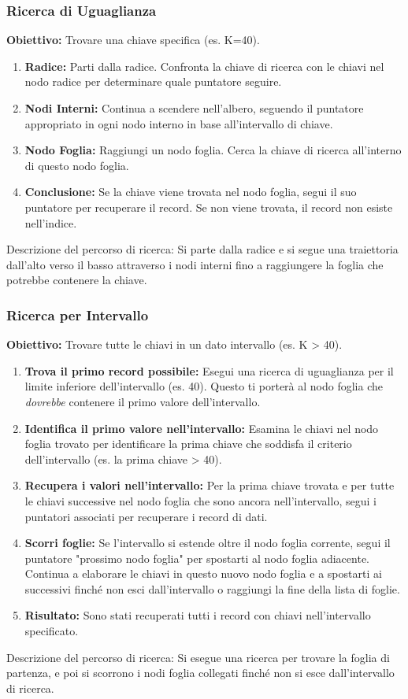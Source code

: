 \subsubsection{Ricerca di Uguaglianza}
\textbf{Obiettivo:} Trovare una chiave specifica (es. K=40).
\begin{enumerate}
    \item \textbf{Radice:} Parti dalla radice. Confronta la chiave di ricerca con le chiavi nel nodo radice per determinare quale puntatore seguire.
    \item \textbf{Nodi Interni:} Continua a scendere nell'albero, seguendo il puntatore appropriato in ogni nodo interno in base all'intervallo di chiave.
    \item \textbf{Nodo Foglia:} Raggiungi un nodo foglia. Cerca la chiave di ricerca all'interno di questo nodo foglia.
    \item \textbf{Conclusione:} Se la chiave viene trovata nel nodo foglia, segui il suo puntatore per recuperare il record. Se non viene trovata, il record non esiste nell'indice.
\end{enumerate}
Descrizione del percorso di ricerca: Si parte dalla radice e si segue una traiettoria dall'alto verso il basso attraverso i nodi interni fino a raggiungere la foglia che potrebbe contenere la chiave.

\subsubsection{Ricerca per Intervallo}
\textbf{Obiettivo:} Trovare tutte le chiavi in un dato intervallo (es. K > 40).
\begin{enumerate}
    \item \textbf{Trova il primo record possibile:} Esegui una ricerca di uguaglianza per il limite inferiore dell'intervallo (es. 40). Questo ti porterà al nodo foglia che \textit{dovrebbe} contenere il primo valore dell'intervallo.
    \item \textbf{Identifica il primo valore nell'intervallo:} Esamina le chiavi nel nodo foglia trovato per identificare la prima chiave che soddisfa il criterio dell'intervallo (es. la prima chiave > 40).
    \item \textbf{Recupera i valori nell'intervallo:} Per la prima chiave trovata e per tutte le chiavi successive nel nodo foglia che sono ancora nell'intervallo, segui i puntatori associati per recuperare i record di dati.
    \item \textbf{Scorri foglie:} Se l'intervallo si estende oltre il nodo foglia corrente, segui il puntatore "prossimo nodo foglia" per spostarti al nodo foglia adiacente. Continua a elaborare le chiavi in questo nuovo nodo foglia e a spostarti ai successivi finché non esci dall'intervallo o raggiungi la fine della lista di foglie.
    \item \textbf{Risultato:} Sono stati recuperati tutti i record con chiavi nell'intervallo specificato.
\end{enumerate}
Descrizione del percorso di ricerca: Si esegue una ricerca per trovare la foglia di partenza, e poi si scorrono i nodi foglia collegati finché non si esce dall'intervallo di ricerca.

